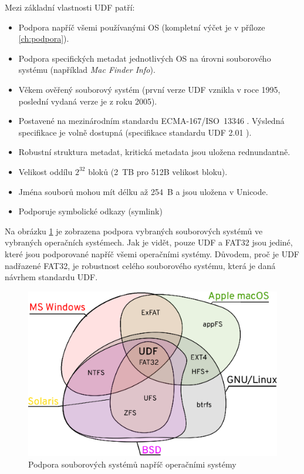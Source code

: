 Mezi základní vlastnosti UDF patří:
\begin{itemize}
    \item Podpora napříč všemi používanými OS (kompletní výčet je v příloze \ref{ch:podpora}).
    \item Podpora specifických metadat jednotlivých OS na úrovni souborového systému (například \textit{Mac Finder Info}).
    \item Věkem ověřený souborový systém (první verze UDF vznikla v roce 1995, poslední vydaná verze je z roku 2005).
    \item Postavené na mezinárodním standardu ECMA-167/ISO~13346 \cite{ecma-167}. Výsledná specifikace je volně dostupná (specifikace standardu UDF 2.01 \cite{osta-udf-0201}).
    \item Robustní struktura metadat, kritická metadata jsou uložena rednundantně.
    \item Velikost oddílu $2^{32}$ bloků (2~TB pro 512B velikost bloku).
    \item Jména souborů mohou mít délku až 254~B a jsou uložena v Unicode.
    \item Podporuje symbolické odkazy (symlink)
\end{itemize}
Na obrázku \ref{fig:udf-podpora} je zobrazena podpora vybraných souborových systémů ve vybraných operačních systémech. Jak je vidět, pouze UDF a FAT32 jsou jediné, které jsou podporované napříč všemi operačními systémy. Důvodem, proč je UDF nadřazené FAT32, je robustnost celého souborového systému, která je daná návrhem standardu UDF.
\begin{figure}[hb] 
    \centering
    \includegraphics[scale=0.82]{obrazky/udf-podpora.eps}
    \caption{Podpora souborových systémů napříč operačními systémy}
    \label{fig:udf-podpora}
\end{figure}

